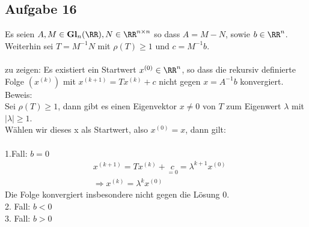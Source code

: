 \subsection*{Aufgabe 16}

Es seien $A,M \in \mathbf{Gl}_n(\RR), N \in \RR^{n\times n}$ so dass $A=M-N$, sowie $b \in \RR^n$. Weiterhin sei $T=M^{-1}N$ mit $\rho(T)\ge 1$ und $c=M^{-1}b$.\\\\
zu zeigen: Es existiert ein Startwert $x^{(0)} \in \RR^n$, so dass die rekursiv definierte Folge $(x^{(k)})$ mit $x^{(k+1)}=Tx^{(k)}+c$ nicht gegen $x=A^{-1}b$ konvergiert.\\
\newline
Beweis:\\
Sei $\rho(T)\ge 1$, dann gibt es einen Eigenvektor $x \neq 0$ von $T$ zum Eigenwert $\lambda$ mit $|\lambda|\ge 1$.\\
Wählen wir dieses x als Startwert, also $x^{(0)}=x$, dann gilt:\\\\
1.Fall: $b=0$
\begin{align*}
&x^{(k+1)}=Tx^{(k)}+ \underset{=0}{c}=\lambda^{k+1}x^{(0)}\\
&\Rightarrow x^{(k)}=\lambda^kx^{(0)}
\end{align*}
Die Folge konvergiert insbesondere nicht gegen die Lösung 0.\\
2. Fall: $b<0$\\
3. Fall: $b>0$